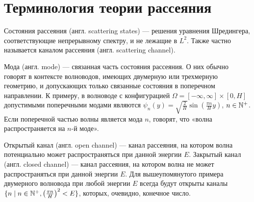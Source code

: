 \section{Терминология теории рассеяния}
Состояния рассеяния (англ. scattering states) — решения уравнения Шредингера, соответствующие непрерывному спектру, и не лежащие в $L^2$. Также частно называется каналом рассеяния (англ. scattering channel).

Мода (англ. mode) — связанная часть состояния рассеяния. О них обычно говорят в контексте волноводов, имеющих двумерную или трехмерную геометрию, и допускающих только связанные состояния в поперечном направлении. К примеру, в волноводе с конфигурацией $\Omega = [-\infty, \infty] \times [0, H]$ допустимыми поперечными модами являются $\psi_n(y) = \sqrt{\frac{2}{H}} \sin(\frac{\pi n}{H} y)$, $n \in \mathbb{N}^+$. Если поперечной частью волны является мода $n$, говорят, что «волна распространяется на $n$-й моде».

Открытый канал (англ. open channel) — канал рассеяния, на котором волна потенциально может распространяться при данной энергии $E$. Закрытый канал (англ. closed channel) — канал рассеяния, на котором волна не может распространяться при данной энергии $E$. Для вышеупомянутого примера двумерного волновода при любой энергии $E$ всегда будут открыты каналы $\{n \mid n \in \mathbb{N}^+, \left(\frac{\pi n}{H}\right)^2 < E \}$, которых, очевидно, конечное число.

